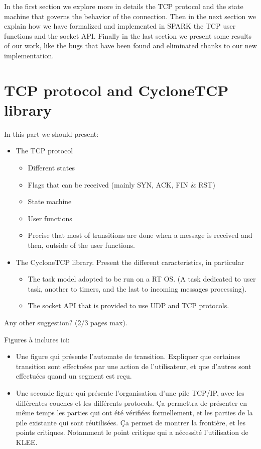 \documentclass[runningheads]{llncs}
\begin{document}
    In the first section we explore more in details the TCP protocol and the state machine that governs the behavior of the connection.
    Then in the next section we explain how we have formalized and implemented in SPARK the TCP user functions and the socket API.
    Finally in the last section we present some results of our work, like the bugs that have been found and eliminated thanks to our
    new implementation.


\section{TCP protocol and CycloneTCP library}
\label{sec:TCP}

    In this part we should present:
    \begin{itemize}
        \item The TCP protocol
        \begin{itemize}
            \item Different states
            \item Flags that can be received (mainly SYN, ACK, FIN \& RST)
            \item State machine
            \item User functions
            \item Precise that most of transitions are done when a message is received and then, outside of the user functions.
        \end{itemize}
        \item The CycloneTCP library. Present the different caracteristics, in particular
        \begin{itemize}
            \item The task model adopted to be run on a RT OS. (A task dedicated to user task, another to timers, and the last to incoming messages processing).
            \item The socket API that is provided to use UDP and TCP protocols.
        \end{itemize}
    \end{itemize}

    Any other suggestion? (2/3 pages max).

    Figures à inclures ici:
    \begin{itemize}
        \item Une figure qui présente l'automate de transition. Expliquer que certaines transition sont effectuées par une action de l'utilisateur,
              et que d'autres sont effectuées quand un segment est reçu.
        \item Une seconde figure qui présente l'organisation d'une pile TCP/IP, avec les différentes couches et les différents protocols.
              Ça permettra de présenter en même temps les parties qui ont été vérifiées formellement, et les parties de la pile existante qui
              sont réutilisées. Ça permet de montrer la frontière, et les points critiques. Notamment le point critique qui a nécessité l'utilisation
              de KLEE.
    \end{itemize}
\end{document}
